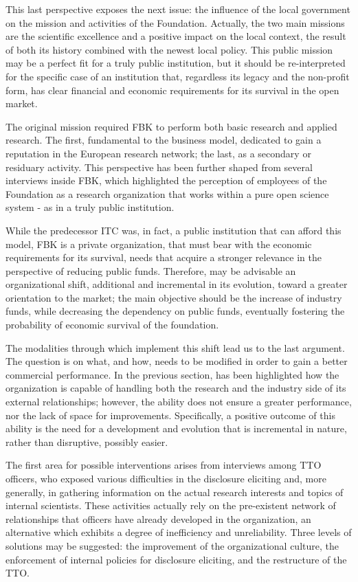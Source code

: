 This last perspective exposes the next issue: the influence of the local government on the mission and activities of the Foundation. Actually, the two main missions are the scientific excellence and a positive impact on the local context, the result of both its history combined with the newest local policy. This public mission may be a perfect fit for a truly public institution, but it should be re-interpreted for the specific case of an institution that, regardless its legacy and the non-profit form, has clear financial and economic requirements for its survival in the open market. 

The original mission required FBK to perform both basic research and applied research. The first, fundamental to the business model, dedicated to gain a reputation in the European research network; the last, as a secondary or residuary activity. This perspective has been further shaped from several interviews inside FBK, which highlighted the perception of employees of the Foundation as a research organization that works within a pure open science system - as in a truly public institution. 

While the predecessor ITC was, in fact, a public institution that can afford this model, FBK is a private organization, that must bear with the economic requirements for its survival, needs that acquire a stronger relevance in the perspective of reducing public funds. Therefore, may be advisable an organizational shift, additional and incremental in its evolution, toward a greater orientation to the market; the main objective should be the increase of industry funds, while decreasing the dependency on public funds, eventually fostering the probability of economic survival of the foundation.

The modalities through which implement this shift lead us to the last argument. The question is on what, and how, needs to be modified in order to gain a better commercial performance. In the previous section, has been highlighted how the organization is capable of handling both the research and the industry side of its external relationships; however, the ability does not ensure a greater performance, nor the lack of space for improvements. Specifically, a positive outcome of this ability is the need for a development and evolution that is incremental in nature, rather than disruptive, possibly easier.

The first area for possible interventions arises from interviews among TTO officers, who exposed various difficulties in the disclosure eliciting and, more generally, in gathering information on the actual research interests and topics of internal scientists. These activities actually rely on the pre-existent network of relationships that officers have already developed in the organization, an alternative which exhibits a degree of inefficiency and unreliability. Three levels of solutions may be suggested: the improvement of the organizational culture, the enforcement of internal policies for disclosure eliciting, and the restructure of the TTO.

